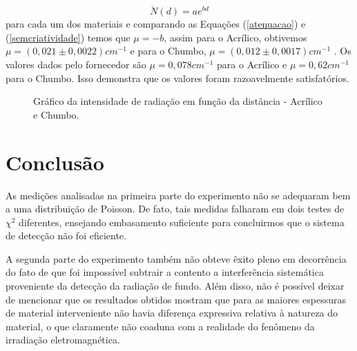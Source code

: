 \documentclass{article}
\begin{document}
\begin{equation}
    \label{semcriatividade}
    \dot N(d) = ae^{bd}
\end{equation}
para cada um dos materiais e comparando as Equações (\ref{atenuacao}) e (\ref{semcriatividade}) temos que $\mu = −b$, assim para o Acrílico, obtivemos $\mu = (0,021 \pm 0,0022) cm ^{−1}$ e para o Chumbo, $\mu = (0,012 \pm 0,0017) cm ^{−1}$ . Os valores dados pelo fornecedor são $\mu = 0,078 cm ^{−1}$ para o Acrílico e $\mu = 0,62 cm ^{−1}$ para o Chumbo. Isso demonstra que os valores foram razoavelmente satisfatórios.

\begin{figure}[H]
    \centering
    \caption{Gráfico da intensidade de radiação em função da distância - Acrílico e Chumbo.}
    \label{com_abs}
\end{figure}


\section{Conclusão}
As medições analisadas na primeira parte do experimento não se adequaram bem a uma distribuição de Poisson. De fato, tais medidas falharam em dois testes de $\chi ^2$ diferentes, ensejando embasamento suficiente para concluirmos que o sistema de detecção não foi eficiente.

A segunda parte do experimento também não obteve êxito pleno em decorrência do fato de que foi impossível subtrair a contento a interferência sistemática proveniente da detecção da radiação de fundo. Além disso, não é possível deixar de mencionar que os resultados obtidos mostram que para as maiores espessuras de material interveniente não havia diferença expressiva relativa à natureza do material, o que claramente não coaduna com a realidade do fenômeno da irradiação eletromagnética.
\end{document}
